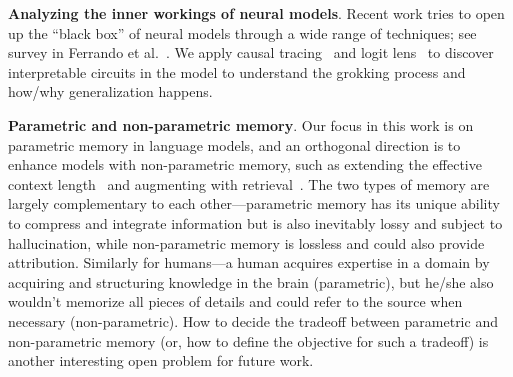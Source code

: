 \noindent\textbf{Analyzing the inner workings of neural models}. Recent work tries to open up the ``black box'' of neural models through a wide range of techniques; see survey in Ferrando et al.~\citep{ferrando2024primer}. We apply causal tracing~\citep{vig2020investigating, meng2022locating, hanna2023how, wang2023interpretability, feng2024how} and logit lens~\citep{nostalgebraist2020, geva-etal-2022-transformer, yang2024large} to discover interpretable circuits in the model to understand the grokking process and how/why generalization happens.

\noindent\textbf{Parametric and non-parametric memory}. Our focus in this work is on parametric memory in language models, and an orthogonal direction is to enhance models with non-parametric memory, such as extending the effective context length~\citep{xiong2023effective, openai_devday_2023, fu2024data, google2024gemini} and augmenting with retrieval~\citep{guu2020retrieval, lewis2020retrieval, borgeaud2022improving, tay2022transformer, zhong-etal-2022-training, min-etal-2023-nonparametric}. The two types of memory are largely complementary to each other---parametric memory has its unique ability to compress and integrate information but is also inevitably lossy and subject to hallucination, while non-parametric memory is lossless and could also provide attribution. Similarly for humans---a human acquires expertise in a domain by acquiring and structuring knowledge in the brain (parametric), but he/she also wouldn't memorize all pieces of details and could refer to the source when necessary (non-parametric). How to decide the tradeoff between parametric and non-parametric memory (or, how to define the objective for such a tradeoff) is another interesting open problem for future work.
